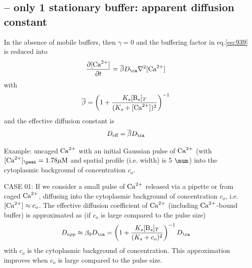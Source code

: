 \subsection{-- only 1 stationary buffer: apparent diffusion constant}
\label{sec:apparent-diffusion-constant}
\label{sec:stat-buff-only}
\label{sec:no-mobile-buffers}

In the absence of mobile buffers, then $\gamma = 0$ and the buffering factor in
eq.\ref{eq:939} is reduced into 
% 
\begin{equation}
  \label{eq:1090}
  \frac{\partial [\Ca]}{\partial t} =\overline{\beta}D_\ca\nabla^2[\Ca]
\end{equation}
with
\begin{equation}
  \label{eq:1091}
  \overline{\beta} = \left( 1 +
    \frac{K_s[\ce{B_s}]_T}{(K_s+[\Ca])^2} \right)^{-1}  
\end{equation}
and the effective diffusion constant is
\begin{equation}
  \label{eq:1106}
  D_\text{eff} = \overline{\beta} D_\ca
\end{equation}


Example: uncaged ${\text{Ca}^{2+}}$ with an initial Gaussian pulse of ${\text{Ca}^{2+}}$ (with
$[\Ca]_\peak = 1.78 \muM$ and spatial profile (i.e. width) is 5 $\mum$) into the
cytoplasmic background of concentration $c_o$. 

CASE 01: If we consider a small pulse of ${\text{Ca}^{2+}}$ released via a pipette or from
caged ${\text{Ca}^{2+}}$, diffusing into the cytoplasmic background of concentration $c_o$, i.e.
$[{\text{Ca}^{2+}}] \approx c_o$.
The effective diffusion coefficient of ${\text{Ca}^{2+}}$ (including ${\text{Ca}^{2+}}$-bound buffer) is
approximated as (if $c_o$ is large compared to the pulse size)
\begin{equation}
  \label{eq:1105}
D_{app} \approx \beta_0 D_\ca = \left( 1 +
    \frac{K_s[\ce{B_s}]_T}{(K_s+c_o)^2} \right)^{-1}  D_\ca
\end{equation}
with $c_o$ is the cytoplasmic background of concentration.
This approximation improves when $c_o$ is large compared to the pulse
size. 

